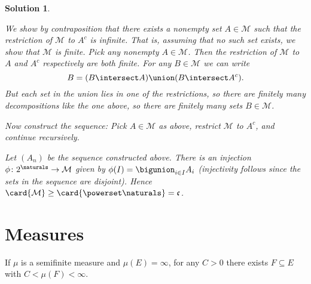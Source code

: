 \documentclass[article, a4paper, 11pt, oneside]{memoir}
\numberwithin{equation}{chapter}
\newcommand{\calM}{\mathcal{M}}
\theoremstyle{nonumberplain}
\newtheorem{solution}{Solution}
\begin{document}
\begin{solution}
\begin{solutionsec}
	\item We show by contraposition that there exists a nonempty set $A \in \calM$ such that the restriction of $\calM$ to $A^c$ is infinite. That is, assuming that no such set exists, we show that $\calM$ is finite. Pick any nonempty $A \in \calM$. Then the restriction of $\calM$ to $A$ and $A^c$ respectively are both finite. For any $B \in \calM$ we can write
	\begin{equation*}
		B = (B \intersect A) \union (B \intersect A^c).
	\end{equation*}
	But each set in the union lies in one of the restrictions, so there are finitely many decompositions like the one above, so there are finitely many sets $B \in \calM$.
	
	Now construct the sequence: Pick $A \in \calM$ as above, restrict $\calM$ to $A^c$, and continue recursively.
	
	\item Let $(A_n)$ be the sequence constructed above. There is an injection $\phi\colon 2^\naturals \to \calM$ given by $\phi(I) = \bigunion_{i \in I} A_i$ (injectivity follows since the sets in the sequence are disjoint). Hence $\card{\calM} \geq \card{\powerset\naturals} = \mathfrak{c}$.
\end{solutionsec}
\end{solution}





\section{Measures}

\begin{exerciseframed*}[14]
    If $\mu$ is a semifinite measure and $\mu(E) = \infty$, for any $C > 0$ there exists $F \subseteq E$ with $C < \mu(F) < \infty$.
\end{exerciseframed*}
\end{document}
